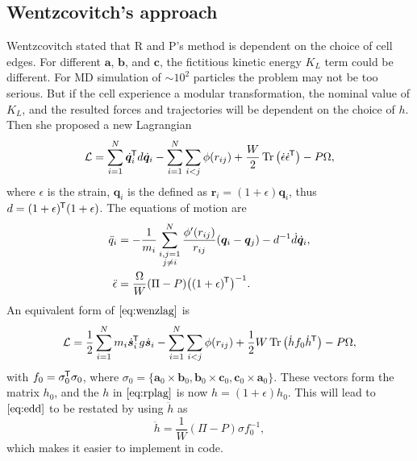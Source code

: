 \subsection{Wentzcovitch's approach}

Wentzcovitch stated that R and P's method is dependent on
the choice of cell edges.\cite{Wentzcovitch:1991ka}
For different $\bm{a}$, $\bm{b}$, and
$\bm{c}$, the fictitious kinetic energy $K_L$ term could be different.
For MD simulation of $\sim 10^2$ particles the problem may
not be too serious. But if the cell experience a modular transformation,
the nominal value of $K_L$, and the resulted forces and trajectories
will be dependent on the choice of $h$. Then she proposed a new
Lagrangian
\begin{equation}\label{eq:wenzlag}
	\mathcal{L} = \sum_{i=1}^{N} \dot{ \bm{q} }_i^{\mkern-1.5mu\mathsf{T}} d \dot{ \bm{q} }_i
	- \sum_{i=1}^{N} \sum_{i<j} \phi(r_{ij}) + \frac{ W }{ 2 }
	\operatorname{Tr} \big( \dot{ \epsilon } \dot{ \epsilon }^{\mkern-1.5mu\mathsf{T}} \big) - P \Omega,
\end{equation}
where $\epsilon$ is the strain, $\bm{q}_i$ is the defined as
$\bm{r}_i = (1+\epsilon) \bm{q}_i$, thus $d = (1 + \epsilon)^{\mkern-1.5mu\mathsf{T}}
(1+\epsilon)$.
The equations of motion are
\begin{align}
	\ddot{q}_i      & = - \frac{ 1 }{ m_i } \sum_{\substack{i, j=1 \\j\neq i}}^{N}
	\frac{ \phi'(r_{ij}) }{ r_{ij} }(\bm{q}_i - \bm{q}_j) - d^{-1} \dot{ d }
	\dot{ \bm{q} }_i,\\
	\ddot{\epsilon} & = \frac{ \Omega }{ W } (\Pi - P)
	\big((1+\epsilon)^{\mkern-1.5mu\mathsf{T}}\big)^{-1}.\label{eq:edd}
\end{align}
An equivalent form of $\eqref{eq:wenzlag}$ is
\begin{equation}
	\mathcal{L} = \frac{ 1 }{ 2 } \sum_{i=1}^{N} m_i \dot{ \bm{s} }_i ^{\mkern-1.5mu\mathsf{T}}
	g \dot{ \bm{s} }_i - \sum_{i=1}^{N} \sum_{i<j} \phi (r_{ij}) +
	\frac{ 1 }{ 2 } W \operatorname{Tr} \big(\dot{h} f_0 \dot{h}^{\mkern-1.5mu\mathsf{T}} \big) - P \Omega,
\end{equation}
with $f_0 = \sigma_0 ^{\mkern-1.5mu\mathsf{T}} \sigma_0$, where $\sigma_0 = \{
\bm{a}_0 \times \bm{b}_0, \bm{b}_0 \times \bm{c}_0,
\bm{c}_0 \times \bm{a}_0 \}$. These vectors form the matrix $h_0$,
and the $h$ in $\eqref{eq:rplag}$ is now $h = (1+\epsilon) h_0$.
This will lead to $\eqref{eq:edd}$ to be restated by using $\ddot{h}$
as
\begin{equation}\label{eq:wenzhdd}
	\ddot{h} = \frac{ 1 }{ W } (\Pi - P) \sigma f_0^{-1},
\end{equation}
which makes it easier to implement in code.

